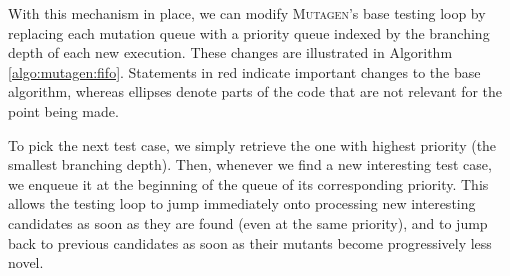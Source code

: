 \documentclass[acmsmall, anonymous]{acmart}
\newcommand{\mutagen}{\textsc{Mutagen}\xspace}
\begin{document}
With this mechanism in place, we can modify \mutagen's base testing loop by
replacing each mutation queue with a priority queue indexed by the branching
depth of each new execution.
%
These changes are illustrated in Algorithm \ref{algo:mutagen:fifo}.
%
Statements in {\color{red} red} indicate important changes to the base
algorithm, whereas ellipses denote parts of the code that are not relevant for
the point being made.


To pick the next test case, we simply retrieve the one with highest priority
(the smallest branching depth).
%
Then, whenever we find a new interesting test case, we enqueue it at the
beginning of the queue of its corresponding priority.
%
This allows the testing loop to jump immediately onto processing new interesting
candidates as soon as they are found (even at the same priority), and to jump
back to previous candidates as soon as their mutants become progressively less
novel.
\end{document}
